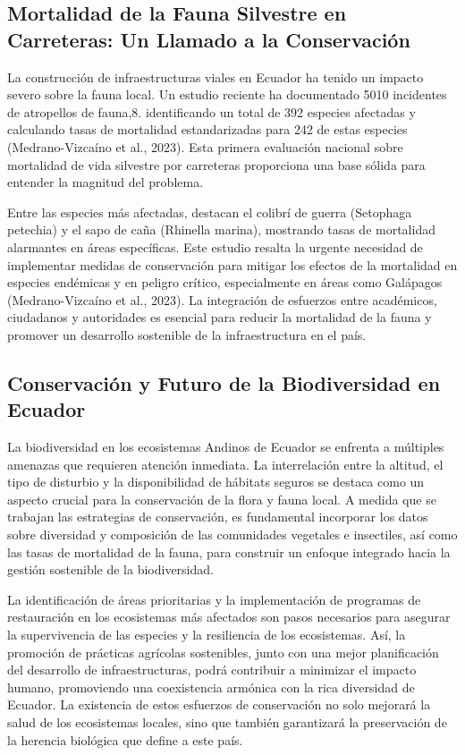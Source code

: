 \documentclass[
  letterpaper,
  DIV=11,
  numbers=noendperiod,
  oneside]{scrreprt}
\begin{document}
\subsection{Mortalidad de la Fauna Silvestre en Carreteras: Un Llamado a
la
Conservación}\label{mortalidad-de-la-fauna-silvestre-en-carreteras-un-llamado-a-la-conservaciuxf3n}

La construcción de infraestructuras viales en Ecuador ha tenido un
impacto severo sobre la fauna local. Un estudio reciente ha documentado
5010 incidentes de atropellos de fauna,8. identificando un total de 392
especies afectadas y calculando tasas de mortalidad estandarizadas para
242 de estas especies (Medrano-Vizcaíno et al., 2023). Esta primera
evaluación nacional sobre mortalidad de vida silvestre por carreteras
proporciona una base sólida para entender la magnitud del problema.

Entre las especies más afectadas, destacan el colibrí de guerra
(Setophaga petechia) y el sapo de caña (Rhinella marina), mostrando
tasas de mortalidad alarmantes en áreas específicas. Este estudio
resalta la urgente necesidad de implementar medidas de conservación para
mitigar los efectos de la mortalidad en especies endémicas y en peligro
crítico, especialmente en áreas como Galápagos (Medrano-Vizcaíno et al.,
2023). La integración de esfuerzos entre académicos, ciudadanos y
autoridades es esencial para reducir la mortalidad de la fauna y
promover un desarrollo sostenible de la infraestructura en el país.

\subsection{Conservación y Futuro de la Biodiversidad en
Ecuador}\label{conservaciuxf3n-y-futuro-de-la-biodiversidad-en-ecuador}

La biodiversidad en los ecosistemas Andinos de Ecuador se enfrenta a
múltiples amenazas que requieren atención inmediata. La interrelación
entre la altitud, el tipo de disturbio y la disponibilidad de hábitats
seguros se destaca como un aspecto crucial para la conservación de la
flora y fauna local. A medida que se trabajan las estrategias de
conservación, es fundamental incorporar los datos sobre diversidad y
composición de las comunidades vegetales e insectiles, así como las
tasas de mortalidad de la fauna, para construir un enfoque integrado
hacia la gestión sostenible de la biodiversidad.

La identificación de áreas prioritarias y la implementación de programas
de restauración en los ecosistemas más afectados son pasos necesarios
para asegurar la supervivencia de las especies y la resiliencia de los
ecosistemas. Así, la promoción de prácticas agrícolas sostenibles, junto
con una mejor planificación del desarrollo de infraestructuras, podrá
contribuir a minimizar el impacto humano, promoviendo una coexistencia
armónica con la rica diversidad de Ecuador. La existencia de estos
esfuerzos de conservación no solo mejorará la salud de los ecosistemas
locales, sino que también garantizará la preservación de la herencia
biológica que define a este país.
\end{document}
